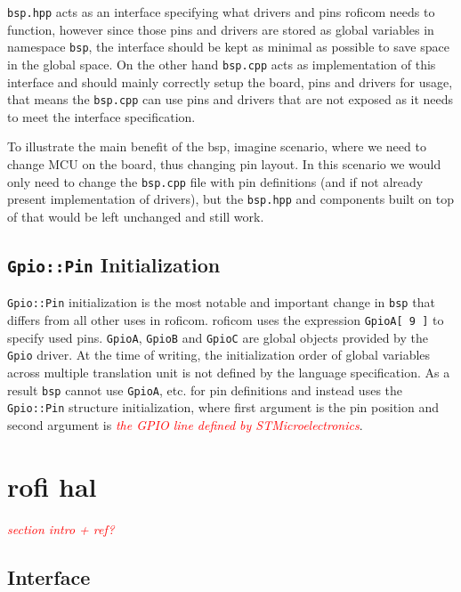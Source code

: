 \documentclass[
  digital,     %
  oneside,     %
  nosansbold,  %
  nocolorbold, %
  lof,         %
  lot,         %
]{fithesis4}
\newcommand{\TODO}[1]{\textcolor{red}{\textit{#1}}}
\begin{document}
{{{\verb|bsp.hpp| acts as an interface specifying what drivers and pins \acrshort{roficom} needs to function, however since those pins and drivers are stored as global variables in namespace \lstinline{bsp}, the interface should be kept as minimal as possible to save space in the global space. On the other hand \verb|bsp.cpp| acts as implementation of this interface and should mainly correctly setup the board, pins and drivers for usage, that means the \verb|bsp.cpp| can use pins and drivers that are not exposed as it needs to meet the interface specification.

To illustrate the main benefit of the \acrshort{bsp}, imagine scenario, where we need to change MCU on the board, thus changing pin layout. In this scenario we would only need to change the \verb|bsp.cpp| file with pin definitions (and if not already present implementation of drivers), but the \verb|bsp.hpp| and components built on top of that would be left unchanged and still work.

\section[ Gpio::Pin Initialization ]{ \lstinline|Gpio::Pin| Initialization }
\lstinline{Gpio::Pin} initialization is the most notable and important change in \lstinline{bsp} that differs from all other uses in \acrshort{roficom}. \acrshort{roficom} uses the expression \lstinline{GpioA[ 9 ]} to specify used pins. \lstinline{GpioA}, \lstinline{GpioB} and \lstinline{GpioC} are global objects provided by the \lstinline{Gpio} driver. At the time of writing, the initialization order of global variables across multiple translation unit is not defined by the language specification. As a result \lstinline{bsp} cannot use \lstinline{GpioA}, etc. for pin definitions and instead uses the \lstinline{Gpio::Pin} structure initialization, where first argument is the pin position and second argument is \TODO{the GPIO line defined by STMicroelectronics}.

\chapter[ RoFI Hardware Abstraction Layer ]{ \acrshort{rofi} \acrlong{hal} }

\TODO{section intro + ref?}

\section{Interface}

}}}
\end{document}
